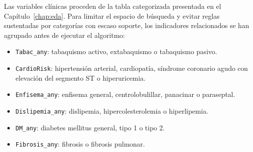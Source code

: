 
Las variables clínicas proceden de la tabla categorizada presentada en el Capítulo~\ref{chap:eda}. Para limitar el espacio de búsqueda y evitar reglas sustentadas por categorías con escaso soporte, los indicadores relacionados se han agrupado antes de ejecutar el algoritmo:

\begin{itemize}
    \setlength{\itemsep}{0pt}
    \item \texttt{Tabac\_any}: tabaquismo activo, extabaquismo o tabaquismo pasivo.
    \item \texttt{CardioRisk}: hipertensión arterial, cardiopatía, síndrome coronario agudo con elevación del segmento ST o hiperuricemia.
    \item \texttt{Enfisema\_any}: enfisema general, centrolobulillar, panacinar o paraseptal.
    \item \texttt{Dislipemia\_any}: dislipemia, hipercolesterolemia o hiperlipemia.
    \item \texttt{DM\_any}: diabetes mellitus general, tipo 1 o tipo 2.
    \item \texttt{Fibrosis\_any}: fibrosis o fibrosis pulmonar.
\end{itemize}

